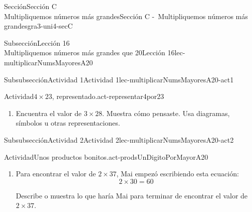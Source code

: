 \begin{sectionptx}{Sección}{{\Large Sección C\\}Multipliquemos números más grandes}{}{Sección C -~Multipliquemos números más grandes}{}{}{gra3-uni4-secC}
\begin{subsectionptx}{Subsección}{{\normalsize Lección 16\\[-0.05cm]}Multipliquemos números más grandes que 20}{}{Lección 16}{}{}{lec-multiplicarNumsMayoresA20}
\begin{subsubsectionptx}{Subsubsección}{Actividad 1}{}{Actividad 1}{}{}{lec-multiplicarNumsMayoresA20-act1}
\begin{activity}{Actividad}{\(4\times 23\), representado.}{act-representar4por23}
\begin{enumerate}
\begin{sidebyside}{2}{0}{0.3}{0.05}
\begin{sbspanel}{0.6}[center]
\texttt{[image: external/svg-source/tikz-file-152972-scale13.pdf]}
\end{sbspanel}%
\end{sidebyside}%
\begin{sidebyside}{2}{0}{0.3}{0.05}%
\begin{sbspanel}{0.05}[center]%
C%
\end{sbspanel}%
\begin{sbspanel}{0.6}[center]%
\texttt{[image: external/svg-source/tikz-file-152973-scale13.pdf]}
\end{sbspanel}%
\end{sidebyside}%
\begin{sidebyside}{2}{0}{0.3}{0.05}%
\begin{sbspanel}{0.05}[center]%
D%
\end{sbspanel}%
\begin{sbspanel}{0.6}[center]%
\texttt{[image: external/svg-source/tikz-file-152974-scale13.pdf]}
\end{sbspanel}%
\end{sidebyside}%
%
\begin{enumerate}
\item{}¿Qué observas sobre los números de sus diagramas?%
\item{}¿Cuál diagrama usarías para encontrar el valor de \(4\times 23\)? Explica tu razonamiento.%
\end{enumerate}
\item{}Encuentra el valor de \(3\times 28\). Muestra cómo pensaste. Usa diagramas, símbolos u otras representaciones.%
\end{enumerate}
\end{activity}%
\end{subsubsectionptx}
%
%
\typeout{************************************************}
\typeout{************************************************}
%
\clearpage
\begin{subsubsectionptx}{Subsubsección}{Actividad 2}{}{Actividad 2}{}{}{lec-multiplicarNumsMayoresA20-act2}
\begin{activity}{Actividad}{Unos productos bonitos.}{act-prodsUnDigitoPorMayorA20}%
%
\begin{enumerate}
\item{}Para encontrar el valor de \(2\times 37\), Mai empezó escribiendo esta ecuación:%
\begin{equation*}
2 \times 30 = 60
\end{equation*}
%
\par
Describe o muestra lo que haría Mai para terminar de encontrar el valor de \(2\times 37\).%

\end{enumerate}
\end{activity}
\end{subsubsectionptx}
\end{subsectionptx}
\end{sectionptx}
